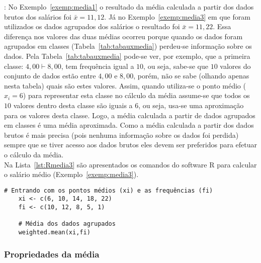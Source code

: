 \documentclass[11pt,fleqn]{book} %
\begin{document}
\vspace{0,5cm}

: No Exemplo~\ref{exemp:media1} o resultado da média calculada a partir dos dados brutos dos salários foi $\bar{x}=11,12$. Já no Exemplo~\ref{exemp:media3} em que foram utilizados os dados agrupados dos salários o resultado foi $\bar{x}=11,22$. Essa diferença nos valores das duas médias ocorreu porque quando os dados foram agrupados em classes (Tabela~\ref{tab:tabauxmedia}) perdeu-se informação sobre os dados. Pela Tabela~\ref{tab:tabauxmedia} pode-se ver, por exemplo, que a primeira classe: $4,00 \vdash 8,00$, tem frequência igual a $10$, ou seja, sabe-se que $10$ valores do conjunto de dados estão entre $4,00$ e $8,00$, porém, não se sabe (olhando apenas nesta tabela) quais são estes valores. Assim, quando utiliza-se o ponto médio ($x_i=6$) para representar esta classe no cálculo da média assume-se que todos os $10$ valores dentro desta classe são iguais a $6$, ou seja, usa-se uma aproximação para os valores desta classe. Logo, a média calculada a partir de dados agrupados em classes é uma média aproximada. Como a média calculada a partir dos dados brutos é mais precisa (pois nenhuma informação sobre os dados foi perdida) sempre que se tiver acesso aos dados brutos eles devem ser preferidos para efetuar o cálculo da média.\\

Na Lista~\ref{lst:Rmedia3} são apresentados os comandos do software R para calcular o salário médio (Exemplo~\ref{exemp:media3}). \\

\begin{scriptsize}
	\estiloR
	\begin{lstlisting}[caption={Comandos do software R}, label=lst:Rmedia3]
	# Entrando com os pontos médios (xi) e as frequências (fi)
	xi <- c(6, 10, 14, 18, 22)
	fi <- c(10, 12, 8, 5, 1)

	# Média dos dados agrupados
	weighted.mean(xi,fi)

	\end{lstlisting}
\end{scriptsize}


\subsubsection{Propriedades da média}
\end{document}
